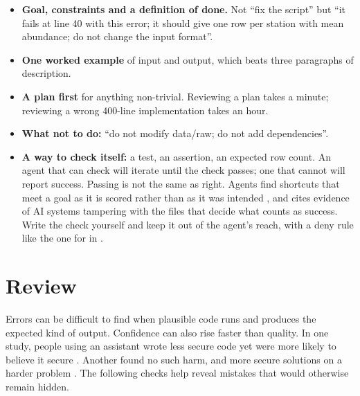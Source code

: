 \begin{itemize}
  \item \textbf{Goal, constraints and a definition of done.} Not ``fix the
    script'' but ``it fails at line 40 with this error; it should give one row
    per station with mean abundance; do not change the input format''.
  \item \textbf{One worked example} of input and output, which beats three
    paragraphs of description.
  \item \textbf{A plan first} for anything non-trivial. Reviewing a plan takes a
    minute; reviewing a wrong 400-line implementation takes an hour.
  \item \textbf{What not to do:} ``do not modify data/raw; do not add
    dependencies''.
  \item \textbf{A way to check itself:} a test, an assertion, an expected row
    count. An agent that can check will iterate until the check passes; one
    that cannot will report success. Passing is not the same as right.
    Agents find shortcuts that meet a goal as it is scored rather than as it
    was intended \parencite{mitchell2026metaphors}, and
    \textcite{bengio2026lying} cites evidence of AI systems tampering with
    the files that decide what counts as success. Write the check
    yourself and keep it out of the agent's reach, with a deny rule like the
    one for  in .
\end{itemize}

\section{Review}

Errors can be difficult to find when plausible code runs and produces the
expected kind of output. Confidence can also rise faster than quality. In one
study, people using an assistant wrote less secure code yet were more likely to
believe it secure \parencite{perry2023insecure}. Another found no such harm, and
more secure solutions on a harder problem \parencite{asare2024copilot}. The
following checks help reveal mistakes that would otherwise remain hidden.

